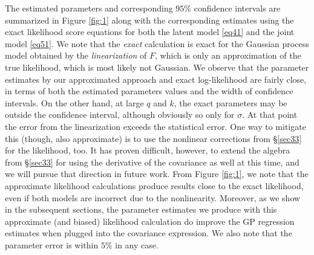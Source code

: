 \documentclass[article,ij4uq]{ij4uq}              %
\begin{document}
 The estimated parameters and corresponding $95\%$ confidence intervals are summarized in Figure \ref{fig:1} along with the corresponding estimates using the exact likelihood score equations for both the latent model \eqref{eq41} and the joint model \eqref{eq51}. We note that the \textit{exact} calculation is exact for the Gaussian process model obtained by the \textit{linearization} of $F$, which is only an approximation of the true likelihood, which is most likely not Gaussian. We  observe that the parameter estimates by our approximated approach and exact log-likelihood are fairly close,  in terms of both the estimated parameters values and the width of confidence intervals. On the other hand, at large $q$ and $k$, the exact parameters may be outside the confidence interval, although obviously so only for $\sigma$.  At that point the error from the linearization exceeds the statistical error. One way to mitigate this (though, also approximate) is to use the nonlinear corrections from \S \ref{sec33} for the likelihood, too. It has proven difficult, however, to extend the algebra from \S \ref{sec33} for using the derivative of the covariance as well at this time, and we will pursue that direction in future work. From  Figure \ref{fig:1}, we note that the approximate likelihood calculations produce results  close to the exact likelihood, even if both models are incorrect due to the nonlinearity. Moreover, as we show in the subsequent sections, the parameter estimates we produce with this approximate (and biased) likelihood calculation do improve the GP regression estimates when plugged into the covariance expression. We also note that the parameter error is within $5\%$ in any case.
\end{document}
